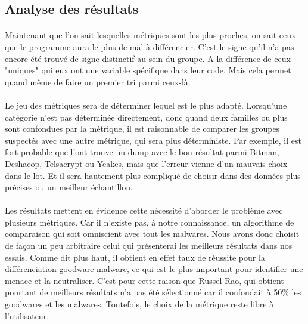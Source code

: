 \documentclass[a4paper, 12pt]{book}
\begin{document}
\subsection{Analyse des résultats}


\paragraph{}
Maintenant que l'on sait lesquelles métriques sont les plus proches, on sait ceux que le programme aura le plus de mal à différencier. C'est le signe qu'il n'a pas encore été trouvé de signe distinctif au sein du groupe. A la différence de ceux "uniques" qui eux ont une variable spécifique dans leur code. Mais cela permet quand même de faire un premier tri parmi ceux-là.


\paragraph{}
Le jeu des métriques sera de déterminer lequel est le plus adapté. Lorsqu'une catégorie n'est pas déterminée directement, donc quand deux familles ou plus sont confondues par la métrique, il est raisonnable de comparer les groupes suspectés avec une autre métrique, qui sera plus déterministe. Par exemple, il est fort probable que l'ont trouve un dump avec le bon résultat parmi Bitman, Deshacop, Telsacrypt ou Yeakes, mais que l'erreur vienne d'un mauvais choix dans le lot. Et il sera hautement plus compliqué de choisir dans des données plus précises ou un meilleur échantillon.


\paragraph{}
Les résultats mettent en évidence cette nécessité d'aborder le problème avec plusieurs métriques. Car il n'existe pas, à notre connaissance, un algorithme de comparaison qui soit omniscient avec tout les malwares. Nous avons donc choisit de façon un peu arbitraire celui qui présenterai les meilleurs résultats dans nos essais. Comme dit plus haut, il obtient en effet taux de réussite pour la différenciation goodware malware, ce qui est le plus important pour identifier une menace et la neutraliser. C'est pour cette raison que Russel Rao, qui obtient pourtant de meilleurs résultats n'a pas été sélectionné car il confondait à 50\% les goodwares et les malwares. Toutefois, le choix de la métrique reste libre à l'utilisateur.
\end{document}
